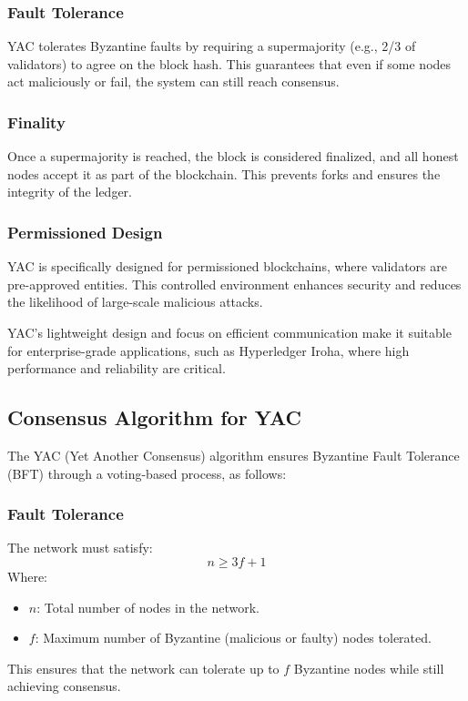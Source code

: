\documentclass{article}
\begin{document}
\subsubsection{Fault Tolerance}
YAC tolerates Byzantine faults by requiring a supermajority (e.g., 2/3 of validators) to agree on the block hash. This guarantees that even if some nodes act maliciously or fail, the system can still reach consensus.

\subsubsection{Finality}
Once a supermajority is reached, the block is considered finalized, and all honest nodes accept it as part of the blockchain. This prevents forks and ensures the integrity of the ledger.

\subsubsection{Permissioned Design}
YAC is specifically designed for permissioned blockchains, where validators are pre-approved entities. This controlled environment enhances security and reduces the likelihood of large-scale malicious attacks.

YAC’s lightweight design and focus on efficient communication make it suitable for enterprise-grade applications, such as Hyperledger Iroha, where high performance and reliability are critical.

\subsection{Consensus Algorithm for YAC}

The YAC (Yet Another Consensus) algorithm ensures Byzantine Fault Tolerance (BFT) through a voting-based process, as follows:

\subsubsection{Fault Tolerance}
The network must satisfy:
\[
    n \geq 3f + 1
\]
Where:
\begin{itemize}
    \item \( n \): Total number of nodes in the network.
    \item \( f \): Maximum number of Byzantine (malicious or faulty) nodes tolerated.
\end{itemize}

This ensures that the network can tolerate up to \( f \) Byzantine nodes while still achieving consensus.
\end{document}
